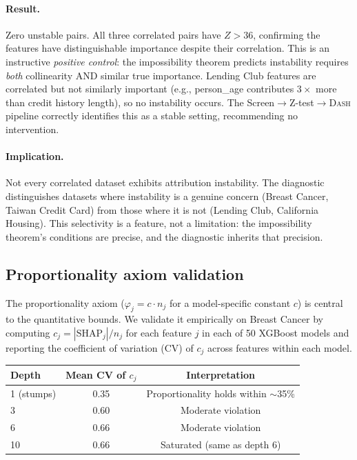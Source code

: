 \documentclass{article}
\newcommand{\DASH}{\textsc{Dash}}
\begin{document}
\paragraph{Result.}
Zero unstable pairs. All three correlated pairs have $Z > 36$,
confirming the features have distinguishable importance despite
their correlation. This is an instructive \emph{positive control}:
the impossibility theorem predicts instability requires \emph{both}
collinearity AND similar true importance. Lending Club features are
correlated but not similarly important (e.g., person\_age contributes
$3\times$ more than credit history length), so no instability occurs.
The Screen$\to$Z-test$\to$\DASH{} pipeline correctly identifies this as a
stable setting, recommending no intervention.

\paragraph{Implication.}
Not every correlated dataset exhibits attribution instability.
The diagnostic distinguishes datasets where instability is a genuine
concern (Breast Cancer, Taiwan Credit Card) from those where it is
not (Lending Club, California Housing). This selectivity is a
feature, not a limitation: the impossibility theorem's conditions are
precise, and the diagnostic inherits that precision.

\subsection{Proportionality axiom validation}

The proportionality axiom ($\varphi_j = c \cdot n_j$ for a
model-specific constant $c$) is central to the quantitative bounds.
We validate it empirically on Breast Cancer by computing
$c_j = |\text{SHAP}_j| / n_j$ for each feature $j$ in each of 50
XGBoost models and reporting the coefficient of variation (CV) of
$c_j$ across features within each model.

\begin{center}
\small
\begin{tabular}{@{}lcc@{}}
\toprule
Depth & Mean CV of $c_j$ & Interpretation \\
\midrule
1 (stumps) & 0.35 & Proportionality holds within $\sim$35\% \\
3 & 0.60 & Moderate violation \\
6 & 0.66 & Moderate violation \\
10 & 0.66 & Saturated (same as depth 6) \\
\bottomrule
\end{tabular}
\end{center}
\end{document}
